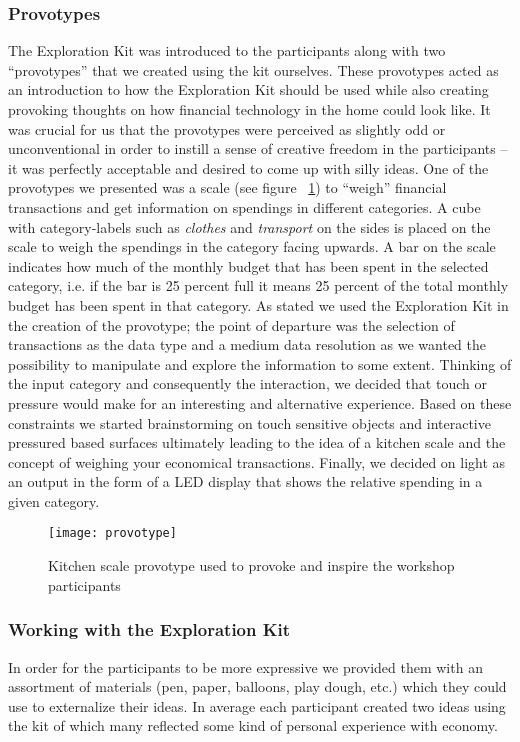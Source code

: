 \subsubsection*{Provotypes}
The Exploration Kit was introduced to the participants along with two “provotypes” \cite{boer2012provotypes} that we created using the kit ourselves. These provotypes acted as an introduction to how the Exploration Kit should be used while also creating provoking thoughts on how financial technology in the home could look like. It was crucial for us that the provotypes were perceived as slightly odd or unconventional in order to instill a sense of creative freedom in the participants -- it was perfectly acceptable and desired to come up with silly ideas. One of the provotypes we presented was a scale (see figure ~\ref{fig:provotype}) to “weigh” financial transactions and get information on spendings in different categories. A cube with category-labels such as \emph{clothes} and \emph{transport} on the sides is placed on the scale to weigh the spendings in the category facing upwards. A bar on the scale indicates how much of the monthly budget that has been spent in the selected category, i.e. if the bar is 25 percent full it means 25 percent of the total monthly budget has been spent in that category. As stated we used the Exploration Kit in the creation of the provotype; the point of departure was the selection of transactions as the data type and a medium data resolution as we wanted the possibility to manipulate and explore the information to some extent. Thinking of the input category and consequently the interaction, we decided that touch or pressure would make for an interesting and alternative experience. Based on these constraints we started brainstorming on touch sensitive objects and interactive pressured based surfaces ultimately leading to the idea of a kitchen scale and the concept of weighing your economical transactions. Finally, we decided on light as an output in the form of a LED display that shows the relative spending in a given category.

\begin{figure}[!h]
	\centering
	\texttt{[image: provotype]}
	\caption{Kitchen scale provotype used to provoke and inspire the workshop participants}
	\label{fig:provotype}
\end{figure}
\subsubsection*{Working with the Exploration Kit}
In order for the participants to be more expressive we provided them with an assortment of materials (pen, paper, balloons, play dough, etc.) which they could use to externalize their ideas. In average each participant created two ideas using the kit of which many reflected some kind of personal experience with economy.

